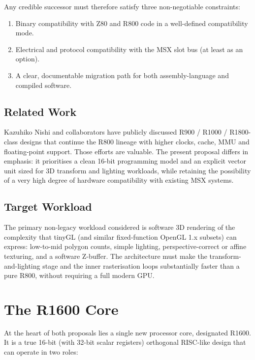 \documentclass[11pt,a4paper]{article}
\begin{document}
Any credible successor must therefore satisfy three non-negotiable constraints:

\begin{enumerate}
    \item Binary compatibility with Z80 and R800 code in a well-defined compatibility mode.
    \item Electrical and protocol compatibility with the MSX slot bus (at least as an option).
    \item A clear, documentable migration path for both assembly-language and compiled software.
\end{enumerate}

\subsection{Related Work}

Kazuhiko Nishi and collaborators have publicly discussed R900 / R1000 / R1800-class designs that continue the R800 lineage with higher clocks, cache, MMU and floating-point support. Those efforts are valuable. The present proposal differs in emphasis: it prioritises a clean 16-bit programming model and an explicit vector unit sized for 3D transform and lighting workloads, while retaining the possibility of a very high degree of hardware compatibility with existing MSX systems.

\subsection{Target Workload}

The primary non-legacy workload considered is software 3D rendering of the complexity that tinyGL (and similar fixed-function OpenGL 1.x subsets) can express: low-to-mid polygon counts, simple lighting, perspective-correct or affine texturing, and a software Z-buffer. The architecture must make the transform-and-lighting stage and the inner rasterisation loops substantially faster than a pure R800, without requiring a full modern GPU.

\section{The R1600 Core}

At the heart of both proposals lies a single new processor core, designated R1600. It is a true 16-bit (with 32-bit scalar registers) orthogonal RISC-like design that can operate in two roles:
\end{document}
